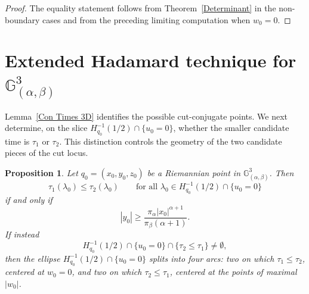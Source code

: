 \documentclass[12pt]{amsart}
\numberwithin{equation}{section}
\theoremstyle{plain}
\newtheorem{proposition}[theorem]{Proposition}%
\theoremstyle{definition}
\theoremstyle{remark}
\begin{document}
\begin{proof}
    The equality statement follows from Theorem~\ref{Determinant} in the non-boundary cases
    and from the preceding limiting computation when \(w_0=0\).
\end{proof}

\section{Extended Hadamard technique for \texorpdfstring{$\mathbb{G}^3_{(\alpha,\beta)}$}{the three-dimensional Grushin space}}
Lemma~\ref{Con Times 3D} identifies the possible cut-conjugate points. We next determine,
on the slice \(H_{q_0}^{-1}(1/2)\cap\{u_0=0\}\), whether the smaller candidate time is
\(\tau_1\) or \(\tau_2\). This distinction controls the geometry of the two candidate
pieces of the cut locus.

\begin{proposition}\label{Tau1 bigger than Tau2}
    Let \(q_0=(x_0,y_0,z_0)\) be a Riemannian point in
    \(\mathbb G^3_{(\alpha,\beta)}\). Then
    \[
        \tau_1(\lambda_0)\leq \tau_2(\lambda_0)
        \qquad
        \text{for all }
        \lambda_0\in H_{q_0}^{-1}(1/2)\cap\{u_0=0\}
    \]
    if and only if
    \begin{equation}\label{separated condition}
        |y_0|
        \geq
        \frac{\pi_\alpha |x_0|^{\alpha+1}}
        {\pi_\beta(\alpha+1)}.
    \end{equation}
    If instead
    \[
        H_{q_0}^{-1}(1/2)\cap\{u_0=0\}\cap\{\tau_2\leq\tau_1\}
        \neq\emptyset,
    \]
    then the ellipse \(H_{q_0}^{-1}(1/2)\cap\{u_0=0\}\) splits into four arcs: two
    on which \(\tau_1\leq\tau_2\), centered at \(w_0=0\), and two on which
    \(\tau_2\leq\tau_1\), centered at the points of maximal \(|w_0|\).
\end{proposition}
\end{document}
